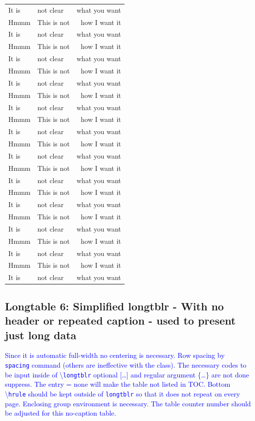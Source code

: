 \documentclass[phd,showgrids]{ndsu-thesis-2022}
\newcommand\italk[1]{\textcolor{blue}{#1}}  %
\newcommand\cmd[1]{\textbackslash\texttt{#1}}  %
\newcommand\vb[1]{\textcolor{blue}{\texttt{#1}}}%
\begin{document}
\begin{longtable}{l @{\hspace{2cm}} l @{\hspace{1.5cm}} r}
It is   & not clear     & what you want \\
Hmmm    & This is not   & how I want it \\
It is   & not clear     & what you want \\
Hmmm    & This is not   & how I want it \\
It is   & not clear     & what you want \\
Hmmm    & This is not   & how I want it \\
It is   & not clear     & what you want \\
Hmmm    & This is not   & how I want it \\
It is   & not clear     & what you want \\
Hmmm    & This is not   & how I want it \\
It is   & not clear     & what you want \\
Hmmm    & This is not   & how I want it \\
It is   & not clear     & what you want \\
Hmmm    & This is not   & how I want it \\
It is   & not clear     & what you want \\
Hmmm    & This is not   & how I want it \\
It is   & not clear     & what you want \\
Hmmm    & This is not   & how I want it \\
It is   & not clear     & what you want \\
Hmmm    & This is not   & how I want it \\
It is   & not clear     & what you want \\
Hmmm    & This is not   & how I want it \\
It is   & not clear     & what you want \\
\end{longtable}
\endgroup
\addtocounter{table}{-1}%

\kant[9]

\subsection{Longtable 6: Simplified longtblr - With no header or repeated caption - used to present just long data}

\italk{Since it is automatic full-width no centering is necessary. Row spacing by \texttt{spacing} command (others are ineffective with the class). The necessary codes to be input inside of \cmd{longtblr} optional [\ldots] and regular argument \{\ldots\} are not done suppress. The entry = none will make the table not listed in TOC. Bottom \cmd{hrule} should be kept outside of \vb{longtblr} so that it does not repeat on every page. Enclosing group environment is necessary. The table counter number should be adjusted for this no-caption table.}
\end{document}
